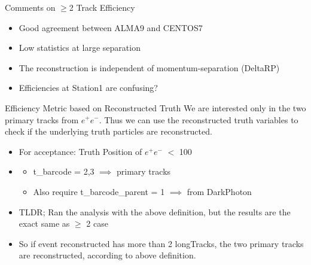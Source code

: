 \begin{frame}{Comments on $\geq$2 Track Efficiency}
    \begin{itemize}
        \item Good agreement between ALMA9 and CENTOS7
        \item Low statistics at large separation
        \item The reconstruction is independent of momentum-separation (DeltaRP)
        \item Efficiencies at Station1 are confusing?

    \end{itemize}
\end{frame}



\begin{frame}{Efficiency Metric based on Reconstructed Truth}
    We are interested only in the two primary tracks from $e^+e^-$. Thus we can use the reconstructed truth variables to check if the underlying truth particles are reconstructed.
    \begin{itemize}
        \item For acceptance: Truth Position of $e^+e^-$ $<$ 100
        \item {}
        \begin{itemize}
            \item t\_barcode = 2,3 $\implies$ primary tracks 
            \item Also require t\_barcode\_parent = 1 $\implies$ from DarkPhoton

        \end{itemize}
        \item TLDR; Ran the analysis with the above definition, but the results are the exact same as $\geq$ 2 case 
        \item So if event reconstructed has more than 2 longTracks, the two primary tracks are reconstructed, according to above definition.
    \end{itemize}
\end{frame}



